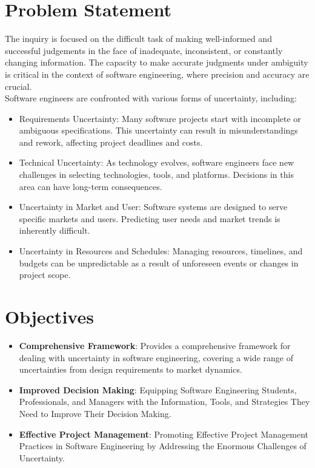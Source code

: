 \documentclass[a4paper,12pt]{report}
\begin{document}
\section{Problem Statement}
The inquiry is focused on the difficult task of making well-informed and successful judgements in the face of inadequate, inconsistent, or constantly changing information. The capacity to make accurate judgments under ambiguity is critical in the context of software engineering, where precision and accuracy are crucial.
\\
Software engineers are confronted with various forms of uncertainty, including:
\begin{itemize}
    \item Requirements Uncertainty: Many software projects start with incomplete or ambiguous specifications. This uncertainty can result in misunderstandings and rework, affecting project deadlines and costs.
    \item Technical Uncertainty: As technology evolves, software engineers face new challenges in selecting technologies, tools, and platforms. Decisions in this area can have long-term consequences.
    \item Uncertainty in Market and User: Software systems are designed to serve specific markets and users. Predicting user needs and market trends is inherently difficult.
    \item Uncertainty in Resources and Schedules: Managing resources, timelines, and budgets can be unpredictable as a result of unforeseen events or changes in project scope.

\end{itemize}
\section{Objectives}
\begin{itemize}
    \item \textbf{Comprehensive Framework}: Provides a comprehensive framework for dealing with uncertainty in software engineering, covering a wide range of uncertainties from design requirements to market dynamics.
    \item \textbf{Improved Decision Making}: Equipping Software Engineering Students, Professionals, and Managers with the Information, Tools, and Strategies They Need to Improve Their Decision Making.
    \item \textbf{Effective Project Management}: Promoting Effective Project Management Practices in Software Engineering by Addressing the Enormous Challenges of Uncertainty.
\end{itemize}
\end{document}
